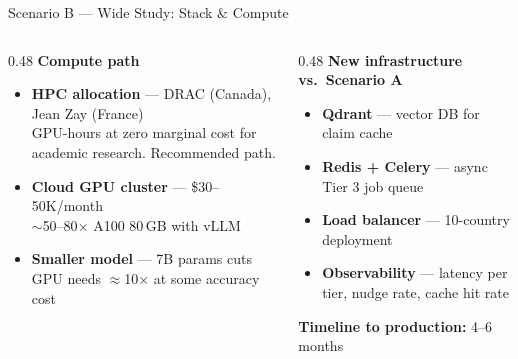 \documentclass[11pt, aspectratio=169]{beamer}
\begin{document}
\begin{frame}{Scenario B — Wide Study: Stack \& Compute}
  \begin{columns}[T]
    \begin{column}{0.48\textwidth}
      \textbf{Compute path}
      \begin{itemize}\setlength{\itemsep}{12pt}
        \item \textbf{HPC allocation} — DRAC (Canada), Jean Zay (France)\\
              GPU-hours at zero marginal cost for academic research.
              \alert{Recommended path.}
        \item \textbf{Cloud GPU cluster} — \$30--50K/month\\
              $\sim$50--80$\times$ A100 80\,GB with vLLM
        \item \textbf{Smaller model} — 7B params cuts GPU needs $\approx$10$\times$ at some accuracy cost
      \end{itemize}
    \end{column}
    \begin{column}{0.48\textwidth}
      \textbf{New infrastructure vs.\ Scenario A}
      \begin{itemize}\setlength{\itemsep}{12pt}
        \item \textbf{Qdrant} — vector DB for claim cache
        \item \textbf{Redis + Celery} — async Tier 3 job queue
        \item \textbf{Load balancer} — 10-country deployment
        \item \textbf{Observability} — latency per tier, nudge rate, cache hit rate
      \end{itemize}

      \bigskip
      \textbf{Timeline to production:} 4--6 months
    \end{column}
  \end{columns}
\end{frame}
\end{document}
